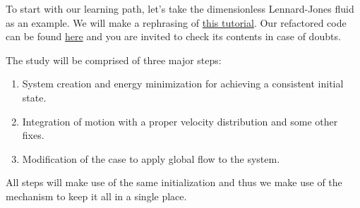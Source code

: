 \begin{frame}{\secname}
To start with our learning path, let's take the dimensionless Lennard-Jones fluid as an example. We will make a rephrasing of \href{https://lammpstutorials.github.io/tutorials/01-SimpleMolecularSimulation.html}{this tutorial}. Our refactored code can be found \href{https://github.com/WallyTutor/learning-scientific-computing/tree/main/molecular-dynamics/lammps/tutorials-simon-gravelle/01-Lennard-Jones-Mixture}{here} and you are invited to check its contents in case of doubts.

\vspace{0.5cm}

The study will be comprised of three major steps:

\vspace{0.5cm}

\begin{enumerate}
\item System creation and energy minimization for achieving a consistent initial state.
\item Integration of motion with a proper velocity distribution and some other fixes.
\item Modification of the case to apply global flow to the system.
\end{enumerate}

\vspace{0.5cm}

All steps will make use of the same initialization and thus we make use of the  mechanism to keep it all in a single place.
\end{frame}

